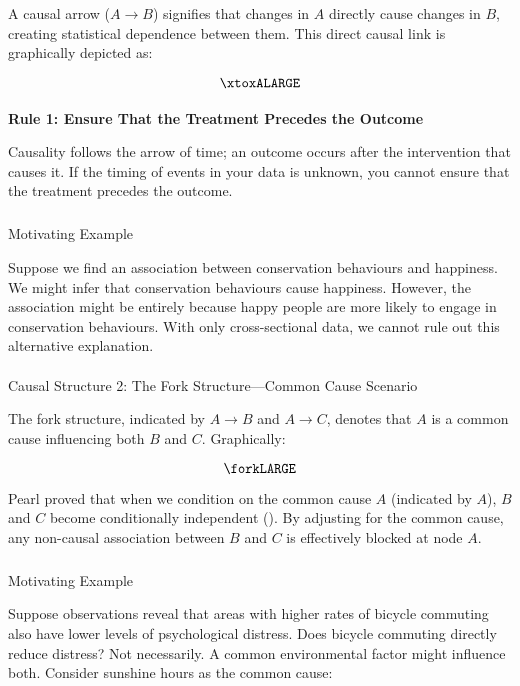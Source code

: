 \documentclass[
  singlecolumn]{article}
\makeatletter
\let\oldparagraph\paragraph
\renewcommand{\paragraph}{
    \@ifstar
      \xxxParagraphStar
      \xxxParagraphNoStar
  }
\newcommand{\xxxParagraphStar}[1]{\oldparagraph*{#1}\mbox{}}
\newcommand{\xxxParagraphNoStar}[1]{\oldparagraph{#1}\mbox{}}
\let\oldsubparagraph\subparagraph
\renewcommand{\subparagraph}{
    \@ifstar
      \xxxSubParagraphStar
      \xxxSubParagraphNoStar
  }
\newcommand{\xxxSubParagraphStar}[1]{\oldsubparagraph*{#1}\mbox{}}
\newcommand{\xxxSubParagraphNoStar}[1]{\oldsubparagraph{#1}\mbox{}}
\makeatother
\begin{document}
A causal arrow (\(A \to B\)) signifies that changes in \(A\) directly
cause changes in \(B\), creating statistical dependence between them.
This direct causal link is graphically depicted as:

\[
\xtoxALARGE
\]

\paragraph{\texorpdfstring{\textbf{Rule 1: Ensure That the Treatment
Precedes the
Outcome}}{Rule 1: Ensure That the Treatment Precedes the Outcome}}\label{sec-four-rules}

Causality follows the arrow of time; an outcome occurs after the
intervention that causes it. If the timing of events in your data is
unknown, you cannot ensure that the treatment precedes the outcome.

\subparagraph{Motivating Example}\label{motivating-example}

Suppose we find an association between conservation behaviours and
happiness. We might infer that conservation behaviours cause happiness.
However, the association might be entirely because happy people are more
likely to engage in conservation behaviours. With only cross-sectional
data, we cannot rule out this alternative explanation.

\paragraph{Causal Structure 2: The Fork Structure---Common Cause
Scenario}\label{causal-structure-2-the-fork-structurecommon-cause-scenario}

The fork structure, indicated by \(A \rightarrow B\) and
\(A \rightarrow C\), denotes that \(A\) is a common cause influencing
both \(B\) and \(C\). Graphically:

\[
\forkLARGE
\]

Pearl proved that when we condition on the common cause \(A\) (indicated
by \(\boxed{A}\)), \(B\) and \(C\) become conditionally independent
(). By adjusting for the common
cause, any non-causal association between \(B\) and \(C\) is effectively
blocked at node \(A\).

\subparagraph{Motivating Example}\label{motivating-example-1}

Suppose observations reveal that areas with higher rates of bicycle
commuting also have lower levels of psychological distress. Does bicycle
commuting directly reduce distress? Not necessarily. A common
environmental factor might influence both. Consider sunshine hours as
the common cause:
\end{document}
